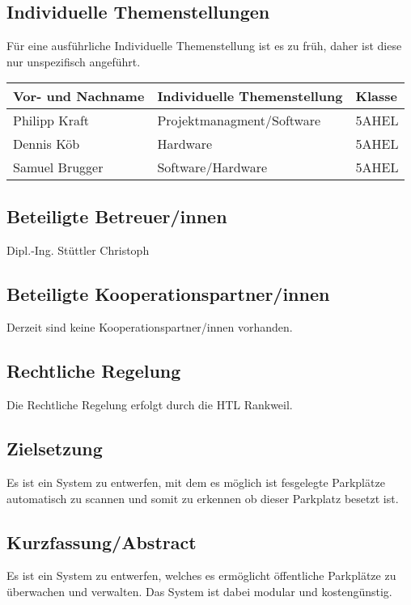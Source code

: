 \documentclass[11pt]{article}
\begin{document}
\subsection{Individuelle Themenstellungen}
Für eine ausführliche Individuelle Themenstellung ist es zu früh, daher ist diese nur unspezifisch angeführt.

\begin{table}[htb]
  \begin{tabular}{|l|l|l|}
    \hline
    \textbf{Vor- und Nachname} & \textbf{Individuelle Themenstellung} & \textbf{Klasse} \\ \hline
    Philipp Kraft              & Projektmanagment/Software            & 5AHEL           \\ \hline
    Dennis Köb                 & Hardware                             & 5AHEL           \\ \hline
    Samuel Brugger             & Software/Hardware                    & 5AHEL           \\ \hline
  \end{tabular}
\end{table}

\subsection{Beteiligte Betreuer/innen}
Dipl.-Ing. Stüttler Christoph 

\subsection{Beteiligte Kooperationspartner/innen}
Derzeit sind keine Kooperationspartner/innen vorhanden.

\subsection{Rechtliche Regelung}
Die Rechtliche Regelung erfolgt durch die HTL Rankweil.

\subsection{Zielsetzung}
Es ist ein System zu entwerfen, mit dem es möglich ist fesgelegte Parkplätze automatisch zu scannen und somit zu erkennen ob dieser Parkplatz besetzt ist.

\subsection{Kurzfassung/Abstract}
Es ist ein System zu entwerfen, welches es ermöglicht öffentliche Parkplätze zu überwachen und verwalten. Das System ist dabei modular und kostengünstig.
\end{document}
